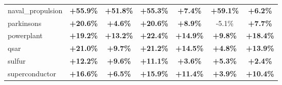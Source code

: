 \begin{table}[!htbp]
{\begin{tabular}{lcccccc}
naval\_propulsion & \textbf{+55.9\%} & \textbf{+51.8\%} & \textbf{+55.3\%} & \textbf{+7.4\%} & \textbf{+59.1\%} & \textbf{+6.2\%} \\
parkinsons & \textbf{+20.6\%} & \textbf{+4.6\%} & \textbf{+20.6\%} & \textbf{+8.9\%} & -5.1\% & \textbf{+7.7\%} \\
powerplant & \textbf{+19.2\%} & \textbf{+13.2\%} & \textbf{+22.4\%} & \textbf{+14.9\%} & \textbf{+9.8\%} & \textbf{+18.4\%} \\
qsar & \textbf{+21.0\%} & \textbf{+9.7\%} & \textbf{+21.2\%} & \textbf{+14.5\%} & \textbf{+4.8\%} & \textbf{+13.9\%} \\
sulfur & \textbf{+12.2\%} & \textbf{+9.6\%} & \textbf{+11.1\%} & \textbf{+3.6\%} & \textbf{+5.3\%} & \textbf{+2.4\%} \\
superconductor & \textbf{+16.6\%} & \textbf{+6.5\%} & \textbf{+15.9\%} & \textbf{+11.4\%} & \textbf{+3.9\%} & \textbf{+10.4\%} \\
\bottomrule
\end{tabular}%
}
\end{table}